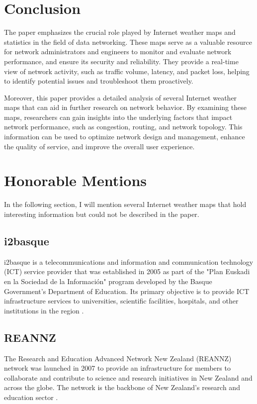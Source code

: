 \documentclass[sigconf,authorversion,nonacm]{acmart}
\begin{document}
\section{Conclusion}

The paper emphasizes the crucial role played by Internet weather maps and statistics in the field of data networking. These maps serve as a valuable resource for network administrators and engineers to monitor and evaluate network performance, and ensure its security and reliability. They provide a real-time view of network activity, such as traffic volume, latency, and packet loss, helping to identify potential issues and troubleshoot them proactively. 

Moreover, this paper provides a detailed analysis of several Internet weather maps that can aid in further research on network behavior. By examining these maps, researchers can gain insights into the underlying factors that impact network performance, such as congestion, routing, and network topology. This information can be used to optimize network design and management, enhance the quality of service, and improve the overall user experience.




\appendix

\section{Honorable Mentions}
In the following section, I will mention several Internet weather maps that hold interesting information but could not be described in the paper.
\subsection{i2basque}
i2basque is a telecommunications and information and communication technology (ICT) service provider that was established in 2005 as part of the "Plan Euskadi en la Sociedad de la Información" program developed by the Basque Government's Department of Education. Its primary objective is to provide ICT infrastructure services to universities, scientific facilities, hospitals, and other institutions in the region \cite{i2basque}.
\subsection{REANNZ}
The Research and Education Advanced Network New Zealand (REANNZ) network was launched in 2007 to provide an infrastructure for members to collaborate and contribute to science and research initiatives in New Zealand and across the globe. The network is the backbone of New Zealand's research and education sector \cite{REANNZ}.
\end{document}
